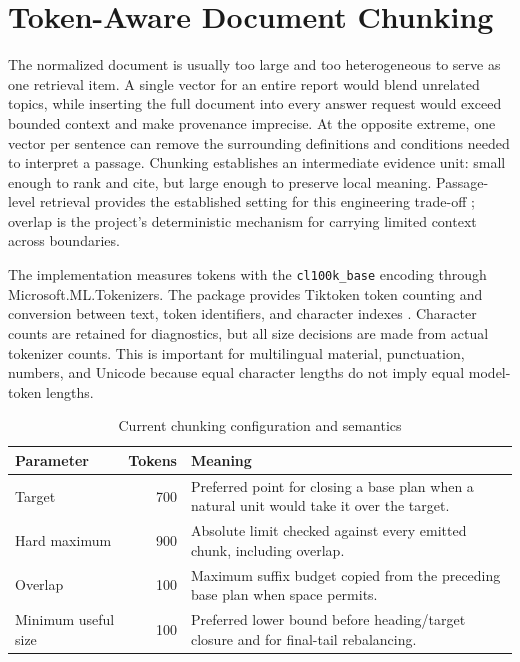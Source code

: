 \section{Token-Aware Document Chunking}
\label{sec:document-chunking}

The normalized document is usually too large and too heterogeneous to serve as
one retrieval item. A single vector for an entire report would blend unrelated
topics, while inserting the full document into every answer request would
exceed bounded context and make provenance imprecise. At the opposite extreme,
one vector per sentence can remove the surrounding definitions and conditions
needed to interpret a passage. Chunking establishes an intermediate evidence
unit: small enough to rank and cite, but large enough to preserve local meaning.
Passage-level retrieval provides the established setting for this engineering
trade-off \cite{Karpukhin2020DPR,Luan2021SparseDense}; overlap is the project's
deterministic mechanism for carrying limited context across boundaries.

The implementation measures tokens with the \texttt{cl100k\_base} encoding
through Microsoft.ML.Tokenizers. The package provides Tiktoken token counting
and conversion between text, token identifiers, and character indexes
\cite{MicrosoftMLTokenizers}. Character counts are retained for diagnostics,
but all size decisions are made
from actual tokenizer counts. This is important for multilingual material,
punctuation, numbers, and Unicode because equal character lengths do not imply
equal model-token lengths.

\begin{table}[!htbp]
	\centering
	\small
	\caption{Current chunking configuration and semantics}
	\label{tab:chunking-configuration}
	\begin{tabular}{p{3.4cm}r p{7.2cm}}
		\toprule
		Parameter & Tokens & Meaning \\
		\midrule
		Target & 700 & Preferred point for closing a base plan when a natural unit would take it over the target. \\
		Hard maximum & 900 & Absolute limit checked against every emitted chunk, including overlap. \\
		Overlap & 100 & Maximum suffix budget copied from the preceding base plan when space permits. \\
		Minimum useful size & 100 & Preferred lower bound before heading/target closure and for final-tail rebalancing. \\
		\bottomrule
	\end{tabular}
\end{table}

